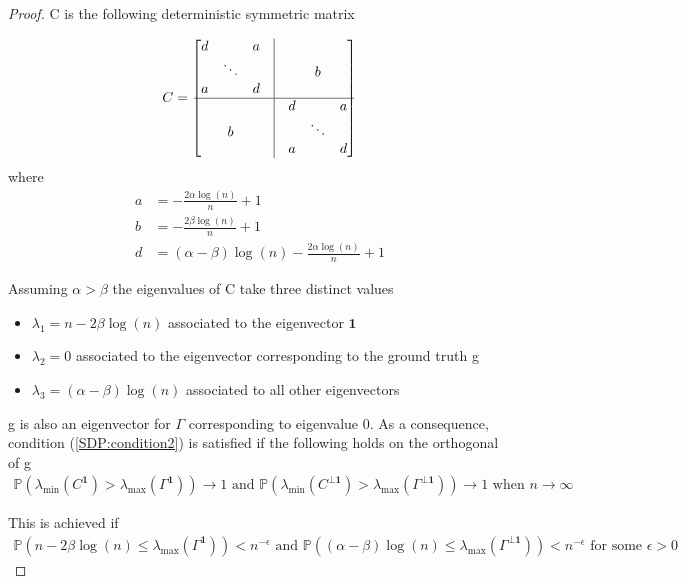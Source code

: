 \documentclass[english]{article}
\newcommand{\1}{\textbf{1}}
\newcommand{\p}{\mathbb{P}}
\begin{document}
 \begin{proof} C is the following deterministic symmetric matrix

\begin{equation*}
C=\begin{bmatrix} d & \text{ } &  a & \vrule & \text{ } & \text{ }  & \text{ } \\
\text{ } & \ddots & \text{ } & \vrule & \text{ }&  b & \text{ } \\
a & \text{ } & d & \vrule & \text{ } & \text{ } & \text{ } \\ \hline
 \text{ } & \text{ }  & \text{ } & \vrule & d & \text{ } & a \\
 \text{ }& b & \text{ }  & \vrule & \text{ } & \ddots & \text{ } \\
\text{ } & \text{ } & \text{ }& \vrule & a & \text{ } & d \\
\end{bmatrix}
\end{equation*}
where
\begin{align}
a&=-\frac{2\alpha \log(n)}{n}+1\\
b&=-\frac{2\beta \log(n)}{n}+1\\
d&=(\alpha-\beta)\log(n)-\frac{2\alpha \log(n)}{n}+1
\end{align}

Assuming $\alpha> \beta$ the eigenvalues of C take three distinct values
\begin{itemize}
\item $\lambda_1=n-2\beta \log(n)$ associated to the eigenvector $\1$
\item $\lambda_2=0$ associated to the eigenvector corresponding to the ground truth g
\item $\lambda_3=(\alpha-\beta)\log(n)$ associated to all other eigenvectors
\end{itemize}
g is also an eigenvector for $\Gamma$ corresponding to eigenvalue 0. As a consequence, condition (\ref{SDP:condition2}) is satisfied if the following holds on the orthogonal of g
\begin{align}
\p\left(\lambda_{\min}(C^\1)>\lambda_{\max}(\Gamma^\1)\right)\rightarrow 1 \text{ and } \p\left(\lambda_{\min}(C^{\perp \1})>\lambda_{\max}(\Gamma^{\perp \1})\right)\rightarrow 1 \text{ when } n \rightarrow \infty
\end{align}

This is achieved if
\begin{align}\label{SDP:condition3}
\p\left(n-2\beta \log(n) \leq \lambda_{\max}(\Gamma^{\1})\right)<n^{-\epsilon}  \text{ and } \p\left((\alpha-\beta)\log(n) \leq \lambda_{\max}(\Gamma^{\perp \1})\right)<n^{-\epsilon} \text{ for some } \epsilon>0
\end{align}
\end{proof}
\end{document}
